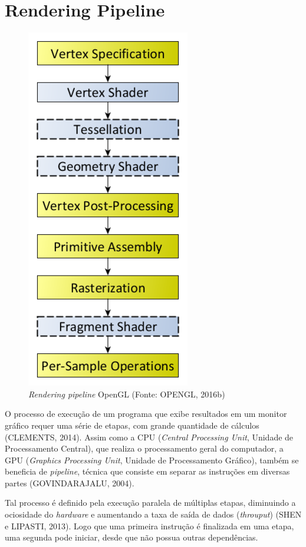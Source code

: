 \chapter{Rendering Pipeline}
\begin{figure}[H]
	\centering
	\includegraphics[scale=0.4]{imagens/openglPipeline.png}
	\caption{\small \textit{Rendering pipeline} OpenGL (Fonte: OPENGL, 2016b)}
	\label{fig:glpipeline}
\end{figure}

O processo de execução de um programa que exibe resultados em um monitor gráfico requer uma série de etapas, com grande quantidade de cálculos (CLEMENTS, 2014). Assim como a CPU (\textit{Central Processing Unit}, Unidade de Processamento Central), que realiza o processamento geral do computador, a GPU (\textit{Graphics Processing Unit}, Unidade de Processamento Gráfico), também se beneficia de \textit{pipeline}, técnica que consiste em separar as instruções em diversas partes (GOVINDARAJALU, 2004).

Tal processo é definido pela execução paralela de múltiplas etapas, diminuindo a ociosidade do \textit{hardware} e aumentando a taxa de saída de dados (\textit{throuput}) (SHEN e LIPASTI, 2013). Logo que uma primeira instrução é finalizada em uma etapa, uma segunda pode iniciar, desde que não possua outras dependências.


